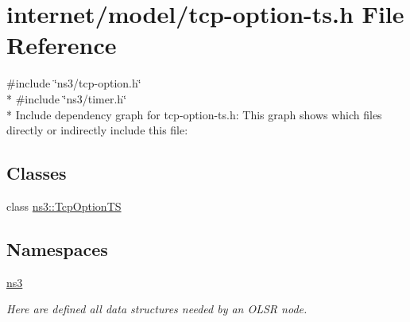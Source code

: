 \hypertarget{tcp-option-ts_8h}{}\section{internet/model/tcp-\/option-\/ts.h File Reference}
\label{tcp-option-ts_8h}
{\ttfamily \#include \char`\"{}ns3/tcp-\/option.\+h\char`\"{}}\\*
{\ttfamily \#include \char`\"{}ns3/timer.\+h\char`\"{}}\\*
Include dependency graph for tcp-\/option-\/ts.h\+:
This graph shows which files directly or indirectly include this file\+:
\subsection*{Classes}
\begin{DoxyCompactItemize}
\item 
class \hyperlink{classns3_1_1TcpOptionTS}{ns3\+::\+Tcp\+Option\+TS}
\end{DoxyCompactItemize}
\subsection*{Namespaces}
\begin{DoxyCompactItemize}
\item 
 \hyperlink{namespacens3}{ns3}
\begin{DoxyCompactList}\small\item\em Here are defined all data structures needed by an O\+L\+SR node. \end{DoxyCompactList}\end{DoxyCompactItemize}
